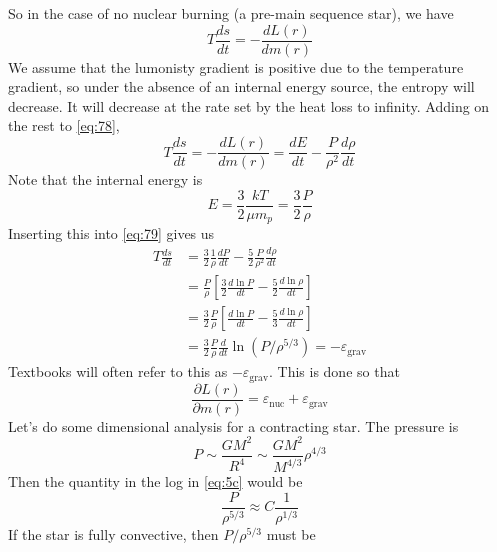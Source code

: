 \documentclass[10pt]{article}
\numberwithin{equation}{section}
\begin{document}
  So in the case of no nuclear burning (a pre-main sequence star), we
  have
  \begin{equation}
    \label{eq:78}
    T\frac{ds}{dt}=-\frac{d L(r)}{dm(r)}
  \end{equation}
  We assume that the lumonisty gradient is positive due to the
  temperature gradient, so under the absence of an internal energy
  source, the entropy will decrease. It will decrease at the rate set
  by the heat loss to infinity. Adding on the rest to \eqref{eq:78},
  \begin{equation}
    \label{eq:79}
    T\frac{ds}{dt}=-\frac{d L(r)}{dm(r)}=\frac{dE}{dt}-\frac{P}
{\rho^2}\frac{d\rho}{dt}
  \end{equation}
  Note that the internal energy is
  \begin{equation}
    \label{eq:79a}
    E=\frac{3}{2}\frac{kT}{\mu m_p}=\frac{3}{2}\frac{P}{\rho}
  \end{equation}
  Inserting this into \eqref{eq:79} gives us
  \begin{align}
    \label{eq:5}
    T\frac{ds}{dt} &=
    \frac{3}{2}\frac{1}{\rho}\frac{dP}{dt}-\frac{5}{2}\frac{P}{\rho^2}\frac
{d\rho}{dt}\\
    \label{eq:5a}
    &= \frac{P}{\rho}\left[\frac{3}{2}\frac{d\ln
        P}{dt}-\frac{5}{2}\frac{d\ln \rho}{dt}\right]\\
    \label{eq:5b}
    &= \frac{3}{2}\frac{P}{\rho}\left[\frac{d\ln
        P}{dt}-\frac{5}{3}\frac{d\ln\rho}{dt}\right]\\
    \label{eq:5c}
    &=\frac{3}{2}\frac{P}{\rho}\frac{d}{dt}\ln \left(
      P/\rho^{5/3}\right)=-\varepsilon_{\mathrm{grav}}
  \end{align}
  Textbooks will often refer to this as
  $-\varepsilon_{\mathrm{grav}}$. This is done so that
  \begin{equation}
    \label{eq:6}
    \frac{\partial L(r)}{\partial
      m(r)}=\varepsilon_{\mathrm{nuc}}+\varepsilon_{\mathrm{grav}}
  \end{equation}
	Let's do some dimensional analysis for a contracting star. The
  pressure is
  \begin{equation}
    \label{eq:7}
    P\sim\frac{GM^2}{R^4}\sim\frac{GM^2}{M^{4/3}}\rho^{4/3}
  \end{equation}
  Then the quantity in the log in \eqref{eq:5c} would be
  \begin{equation}
    \label{eq:8}
    \frac{P}{\rho^{5/3}}\approx C\frac{1}{\rho^{1/3}}
  \end{equation}
  If the star is fully convective, then $P/\rho^{5/3}$ must be
\end{document}
